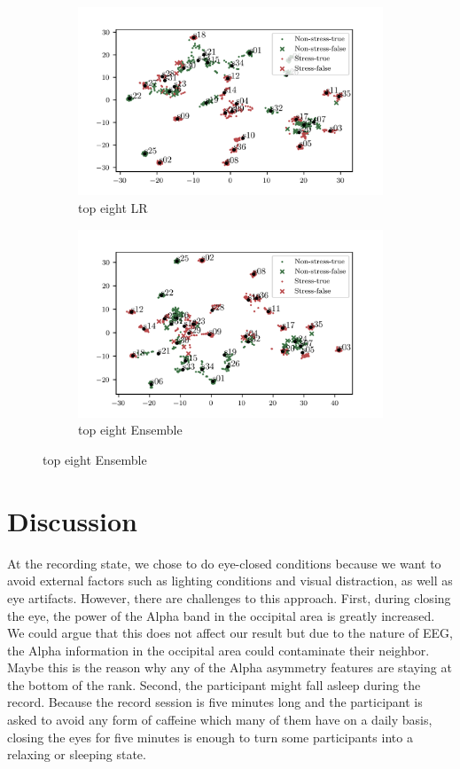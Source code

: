 \documentclass[pdflatex,sn-mathphys]{sn-jnl}%
\theoremstyle{thmstyleone}%
\theoremstyle{thmstyletwo}%
\theoremstyle{thmstylethree}%
\begin{document}
\begin{figure}[h!]
\begin{subfigure}[b]{0.49\textwidth}
        \includegraphics[width=\textwidth]{figures/t-sne-lr-8.png}
        \caption{top eight LR}
    \end{subfigure}
    \hfill
    \begin{subfigure}[b]{0.49\textwidth}
        \centering
        \includegraphics[width=\textwidth]{figures/t-sne-ensemble-8.png}
        \caption{top eight Ensemble}
    \end{subfigure}
\end{figure}

\FloatBarrier

\section{Discussion}\label{sec5}

At the recording state, we chose to do eye-closed conditions because we want to avoid external factors such as lighting conditions and visual distraction, as well as eye artifacts. However, there are challenges to this approach. First, during closing the eye, the power of the Alpha band in the occipital area is greatly increased. We could argue that this does not affect our result but due to the nature of EEG, the Alpha information in the occipital area could contaminate their neighbor. Maybe this is the reason why any of the Alpha asymmetry features are staying at the bottom of the rank. Second, the participant might fall asleep during the record. Because the record session is five minutes long and the participant is asked to avoid any form of caffeine which many of them have on a daily basis, closing the eyes for five minutes is enough to turn some participants into a relaxing or sleeping state. 
\end{document}
